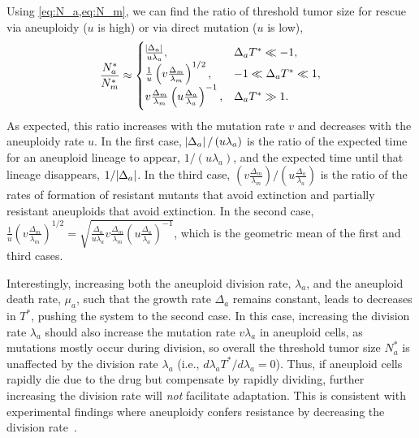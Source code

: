 \documentclass[12pt]{extarticle}
\begin{document}
Using \cref{eq:N_a,eq:N_m}, we can find the ratio of threshold tumor size for rescue via aneuploidy ($u$ is high) or via direct mutation ($u$ is low),
\begin{equation} \label{eq:N_ratio}
\frac{N^*_a}{N^*_m} \approx \begin{cases}
    \frac{\abs{\Delta_a}}{u\lambda_a} ,&
  \Delta_a T^* \ll -1 ,\\ 
  \frac{1}{u}\left(v  \frac{\Delta_m}{\lambda_m}\right)^{1/2} ,&
  -1 \ll \Delta_a T^* \ll 1  ,\\ 
  v \frac{\Delta_m}{\lambda_m}  \left(u\frac{\Delta_a}{\lambda_a}\right)^{-1}  ,&
   \Delta_a T^* \gg 1 .
  \end{cases}
\end{equation}
As expected, this ratio increases with the mutation rate $v$ and decreases with the aneuploidy rate $u$.
In the first case, $\abs{\Delta_a}/\left(u\lambda_a\right)$ is  the ratio of the expected time for an aneuploid lineage to appear, $1/\left(u\lambda_a\right)$, and the expected time until that lineage disappears, $1/\abs{\Delta_a}$.
In the third case, $\left(v \frac{\Delta_m}{\lambda_m}\right) / \left(u \frac{\Delta_a}{\lambda_a}\right)$ is the ratio of the rates of formation of resistant mutants that avoid extinction and partially resistant aneuploids that avoid extinction.
In the second case, $\frac{1}{u}\left(v  \frac{\Delta_m}{\lambda_m}\right)^{1/2}=\sqrt{\frac{\Delta_a}{u\lambda_a}  v \frac{\Delta_m}{\lambda_m}  \left(u\frac{\Delta_a}{\lambda_a}\right)^{-1}}$, which is the geometric mean of the first and third cases.

Interestingly, increasing both the aneuploid division rate, $\lambda_a$, and the aneuploid death rate, $\mu_a$, such that the growth rate $\Delta_a$ remains constant, leads to decreases in $T^*$, pushing the system to the second case. In this case, increasing the division rate $\lambda_a$ should also increase the mutation rate $v\lambda_a$ in aneuploid cells, as mutations mostly occur during division, so overall the threshold tumor size $N_a^*$ is unaffected by the division rate $\lambda_a$ (i.e., $d \lambda_a T^*/d\lambda_a = 0$). Thus, if aneuploid cells rapidly die due to the drug but compensate by rapidly dividing, further increasing  the division rate will \emph{not} facilitate adaptation.
This is consistent with experimental findings where aneuploidy confers resistance by decreasing the division rate~\citep{replogle2020aneuploidy}.
\end{document}
